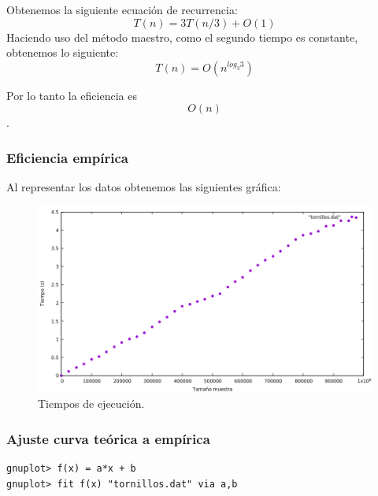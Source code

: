  Obtenemos la siguiente ecuación de recurrencia:
  \begin{equation}
      T(n) = 3T(n/3) + O(1)
  \end{equation}
  Haciendo uso del método maestro, como el segundo tiempo es constante, obtenemos lo siguiente:
  \begin{equation}
      T(n) = O(n^{log_3{3}})
  \end{equation}
  
  Por lo tanto la eficiencia es
  \begin{equation} O(n) \end{equation}.
  


\subsubsection{Eficiencia empírica}

Al representar los datos obtenemos las siguientes gráfica:

\begin{figure}[H]
    \begin{center}
        \includegraphics[scale=0.7]{imagenes/g_tt.png}
        \caption{Tiempos de ejecución.}
        \label{fig19}
    \end{center}
\end{figure}

\subsubsection{Ajuste curva teórica a empírica}

\begin{shaded*}
\begin{verbatim}
gnuplot> f(x) = a*x + b
gnuplot> fit f(x) "tornillos.dat" via a,b

\end{verbatim}
\end{shaded*}

